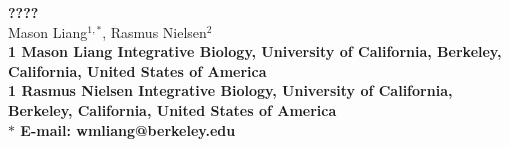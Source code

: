 \usepackage{graphicx,amsmath}
\usepackage{amssymb}

\usepackage{cite}

\usepackage{hyperref}

\usepackage{lineno}

\usepackage{microtype}





\topmargin 0.0cm
\oddsidemargin 0.5cm
\evensidemargin 0.5cm
\textwidth 16cm
\textheight 21cm

\usepackage[labelfont=bf,labelsep=period,justification=raggedright]{caption}



\makeatletter
\renewcommand{\@biblabel}[1]{\quad#1.}
\makeatother


\date{}

\pagestyle{myheadings}






\begin{flushleft}
{\Large
\textbf{????}
}
\\
Mason Liang$^{1,\ast}$,
Rasmus Nielsen$^{2}$
\\
\bf{1} Mason Liang Integrative Biology, University of California, Berkeley, California, United States of America
\\
\bf{1} Rasmus Nielsen Integrative Biology, University of California, Berkeley, California, United States of America
\\
$\ast$ E-mail: wmliang@berkeley.edu
\end{flushleft}


